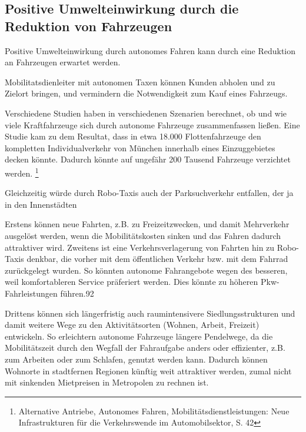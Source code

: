 \subsection{Positive Umwelteinwirkung durch die Reduktion von Fahrzeugen}
Positive Umwelteinwirkung durch autonomes Fahren kann durch eine
Reduktion an Fahrzeugen erwartet werden.

Mobilitatsdienleiter mit autonomen Taxen können
Kunden abholen und zu Zielort bringen,
und vermindern die Notwendigkeit zum Kauf eines Fahrzeugs.

Verschiedene Studien haben in verschiedenen Szenarien berechnet, ob und wie viele Kraftfahrzeuge sich durch autonome Fahrzeuge zusammenfassen ließen.
Eine Studie kam zu dem Resultat, dass in etwa 18.000 Flottenfahrzeuge den kompletten Individualverkehr von München innerhalb eines Einzuggebietes decken könnte.
Dadurch könnte auf ungefähr 200 Tausend Fahrzeuge verzichtet werden.
\footnote{Alternative Antriebe, Autonomes Fahren,
	Mobilitätsdienstleistungen: Neue Infrastrukturen für
	die Verkehrswende im Automobilsektor, S. 42}


Gleichzeitig würde
durch Robo-Taxis auch der Parksuchverkehr entfallen, der ja in den Innenstädten

Erstens können neue Fahrten, z.B. zu Freizeitzwecken, und damit Mehrverkehr
ausgelöst werden, wenn die Mobilitätskosten sinken und das Fahren dadurch
attraktiver wird.
Zweitens ist eine Verkehrsverlagerung von Fahrten hin zu Robo-Taxis denkbar,
die vorher mit dem öffentlichen Verkehr bzw. mit dem Fahrrad zurückgelegt
wurden. So könnten autonome Fahrangebote wegen des besseren, weil komfortableren Service präferiert werden.
Dies könnte zu höheren Pkw-Fahrleistungen führen.92

Drittens können sich längerfristig auch raumintensivere Siedlungsstrukturen und damit weitere Wege zu den Aktivitätsorten (Wohnen, Arbeit, Freizeit) entwickeln.
So erleichtern autonome Fahrzeuge längere Pendelwege, da
die Mobilitätszeit durch den Wegfall der Fahraufgabe anders oder effizienter,
z.B. zum Arbeiten oder zum Schlafen, genutzt werden kann. Dadurch können
Wohnorte in stadtfernen Regionen künftig weit attraktiver werden, zumal nicht
mit sinkenden Mietpreisen in Metropolen zu rechnen ist.

